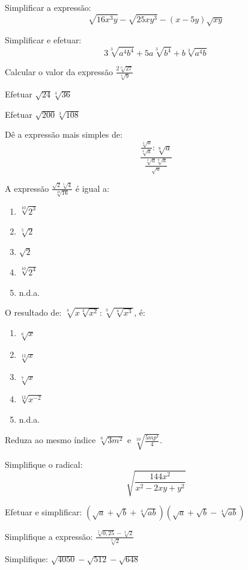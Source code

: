 \begin{exer}[CN]Simplificar a expressão: $$\sqrt{16x^3y} - \sqrt{25xy^3}-(x-5y)\sqrt{xy}$$
\end{exer}
\begin{exer}[CN]Simplificar e efetuar: $$3\sqrt[3]{a^4b^4} + 5a\sqrt[3]{b^4} + b\sqrt[3]{a^4b} $$
\end{exer}
\begin{exer}[EPCAR] Calcular o valor da expressão $\frac{2\sqrt[6]{27}}{\sqrt[4]{9}}$
\end{exer}
\begin{exer}[CN]Efetuar $\sqrt{24}\sqrt[4]{36}$
\end{exer}
\begin{exer}[CN]Efetuar $\sqrt{200}\sqrt[3]{108}$
\end{exer}
\begin{exer}[CN]Dê a expressão mais simples de: $$\frac{\frac{\sqrt[4]{a}}{\sqrt[6]{a}}\colon \sqrt[8]{a}}{\frac{\sqrt[3]{a}\sqrt[9]{a}}{\sqrt{a}}} $$
\end{exer}
\begin{exer}A expressão $\frac{\sqrt{2}\sqrt[5]{4}}{\sqrt[10]{16}}$ é igual a:
\begin{enumerate}[A ( )]
\item $\sqrt[10]{2^3}$
\item $\sqrt[5]{2}$
\item $\sqrt{2}$
\item $\sqrt[10]{2^4}$
\item n.d.a.
\end{enumerate}
\end{exer}
\begin{exer}[EsPCEx]O resultado de: $\sqrt[4]{x\sqrt[3]{x^2}} \colon \sqrt[3]{\sqrt[4]{x^3}}$, é:
\begin{enumerate}[A ( )]
\item $\sqrt[6]{x}$
\item $\sqrt[12]{x}$
\item $\sqrt[7]{x}$
\item $\sqrt[12]{x^{-2}}$
\item n.d.a.
\end{enumerate}
\end{exer}
\begin{exer} Reduza ao mesmo índice $\sqrt[6]{3m^2}$ e $\sqrt[10]{\frac{5mp^3}{4}}$.
\end{exer}
\begin{exer}[PM] Simplifique o radical: $$\sqrt{\frac{144x^2}{x^2-2xy+y^2}}$$
\end{exer}
\begin{exer}[EsPCEx]Efetuar e simplificar: $(\sqrt{a} + \sqrt{b} + \sqrt[4]{ab})(\sqrt{a}+\sqrt{b}-\sqrt[4]{ab})$
\end{exer}
\begin{exer}[CN-Mod]Simplifique a expressão: $\frac{\sqrt[3]{0,25}-\sqrt[3]{2}}{\sqrt[3]{2}}$
\end{exer}
\begin{exer}[PM-Mod]Simplifique: $\sqrt{4050}-\sqrt{512}-\sqrt{648}$
\end{exer}

